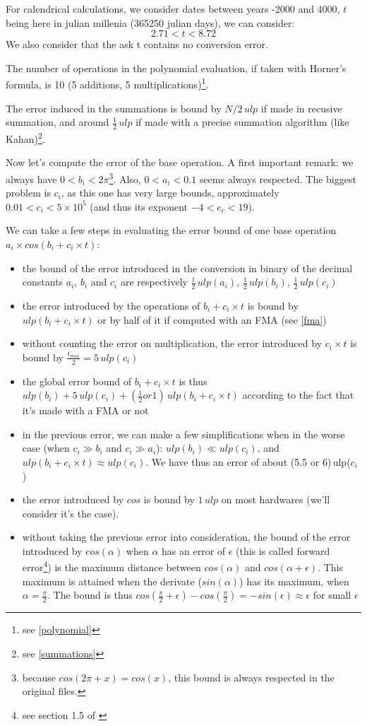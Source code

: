 For calendrical calculations, we consider dates between years -2000 and 4000, $t$ being here in julian millenia (\num{365250} julian days), we can consider: $$2.71 < t < 8.72$$ We also consider that the ask t contains no conversion error.

The number of operations in the polynomial evaluation, if taken with Horner's formula, is 10 (5 additions, 5 multiplications)\footnote{see \ref{polynomial}}. 

The error induced in the summations is bound by $N/2\,ulp$ if made in recusive summation, and around $\frac{1}{2}\,ulp$ if made with a precise summation algorithm (like Kahan)\footnote{see \ref{summations}}.

Now let's compute the error of the base operation. A first important remark: we always have $0<b_i<2\pi$\footnote{because $cos(2\pi+x)=cos(x)$, this bound is always respected in the original files.}. Also, $0<a_i<0.1$ seems always respected. The biggest problem is $c_i$, as this one has very large bounds, approximately $0.01<c_i<5\times10^5$ (and thus its exponent $-4<e_c<19$).

We can take a few steps in evaluating the error bound of one base operation $a_i\times cos(b_i + c_i \times t)$:
\begin{itemize}
\item the bound of the error introduced in the conversion in binary of the decimal constants $a_i$, $b_i$ and $c_i$ are respectively $\frac{1}{2}\,ulp(a_i)$, $\frac{1}{2}\,ulp(b_i)$, $\frac{1}{2}\,ulp(c_i)$
\item the error introduced by the operations of $b_i + c_i \times t$ is bound by $ulp(b_i+c_i\times t)$ or by half of it if computed with an FMA (see \ref{fma})
\item without counting the error on multiplication, the error introduced by $c_i \times t$ is bound by $\frac{t_{max}}{2}=5\,ulp(c_i)$
\item the global error bound of $b_i + c_i \times t$ is thus $ulp(b_i) + 5\,ulp(c_i) + (\frac{1}{2} or 1)\,ulp(b_i+c_i\times t)$ according to the fact that it's made with a FMA or not
\item in the previous error, we can make a few simplifications when in the worse case (when $c_i \gg b_i$ and $c_i \gg a_i$): $ulp(b_i) \ll ulp(c_i)$, and $ulp(b_i+c_i\times t)\approx ulp(c_i)$. We have thus an error of about (5.5 or 6)\,ulp($c_i$)
\item the error introduced by $cos$ is bound by $1\,ulp$ on most hardwares (we'll consider it's the case).
\item without taking the previous error into consideration, the bound of the error introduced by $cos(\alpha)$ when $\alpha$ has an error of $\epsilon$ (this is called forward error\footnote{see section 1.5 of \cite{Higham}}) is the maximum distance between $cos(\alpha)$ and $cos(\alpha + \epsilon)$. This maximum is attained when the derivate ($sin(\alpha)$) has its maximum, when $\alpha = \frac{\pi}{2}$. The bound is thus $cos(\frac{\pi}{2}+\epsilon)-cos(\frac{\pi}{2}) = -sin(\epsilon) \approx \epsilon$ for small $\epsilon$
\end{itemize}


